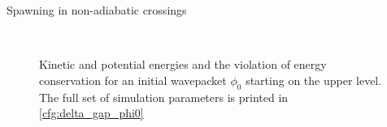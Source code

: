 \begin{chapter}{Spawning in non-adiabatic crossings}
\begin{figure}[h!]
  \centering
   \\
  \caption[Energies for a $\phi_0$ in an avoided crossing]{
  Kinetic and potential energies and the violation of energy conservation for an
  initial wavepacket $\phi_0$ starting on the upper level. The full set of simulation
  parameters is printed in \ref{cfg:delta_gap_phi0}
  \label{fig:basic_delta_gap_phi0_energies}
  }
\end{figure}




\end{chapter}
